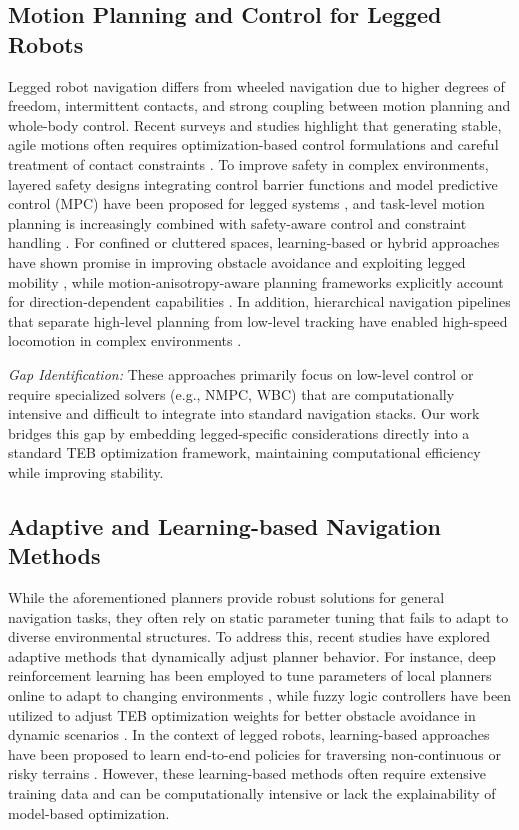 \documentclass[lettersize,journal]{IEEEtran}
\begin{document}
\subsection{Motion Planning and Control for Legged Robots}
Legged robot navigation differs from wheeled navigation due to higher degrees of freedom, intermittent contacts, and strong coupling between motion planning and whole-body control. Recent surveys and studies highlight that generating stable, agile motions often requires optimization-based control formulations and careful treatment of contact constraints \cite{wensingOptimizationBasedControlDynamic2024}. To improve safety in complex environments, layered safety designs integrating control barrier functions and model predictive control (MPC) have been proposed for legged systems \cite{grandia_multi_2023, blisMPCLegged2023}, and task-level motion planning is increasingly combined with safety-aware control and constraint handling \cite{jiSafeMotionPlanning2024}. For confined or cluttered spaces, learning-based or hybrid approaches have shown promise in improving obstacle avoidance and exploiting legged mobility \cite{kolvenbachLearningbasedObstacleAvoidance2022}, while motion-anisotropy-aware planning frameworks explicitly account for direction-dependent capabilities \cite{zhangAgileSafeTrajectory2024}. In addition, hierarchical navigation pipelines that separate high-level planning from low-level tracking have enabled high-speed locomotion in complex environments \cite{kimHighspeedControlNavigation2025}.

\textit{Gap Identification:} These approaches primarily focus on low-level control or require specialized solvers (e.g., NMPC, WBC) that are computationally intensive and difficult to integrate into standard navigation stacks. Our work bridges this gap by embedding legged-specific considerations directly into a standard TEB optimization framework, maintaining computational efficiency while improving stability.

\subsection{Adaptive and Learning-based Navigation Methods}
While the aforementioned planners provide robust solutions for general navigation tasks, they often rely on static parameter tuning that fails to adapt to diverse environmental structures. To address this, recent studies have explored adaptive methods that dynamically adjust planner behavior. For instance, deep reinforcement learning has been employed to tune parameters of local planners online to adapt to changing environments \cite{gaoAdaptiveNavigationMobile2020}, while fuzzy logic controllers have been utilized to adjust TEB optimization weights for better obstacle avoidance in dynamic scenarios \cite{zheng_fuzzy_2023, sun_improved_2022}. In the context of legged robots, learning-based approaches have been proposed to learn end-to-end policies for traversing non-continuous or risky terrains \cite{keReinforcementLearningBased2025, kimHighspeedControlNavigation2025}. However, these learning-based methods often require extensive training data and can be computationally intensive or lack the explainability of model-based optimization. 
\end{document}
